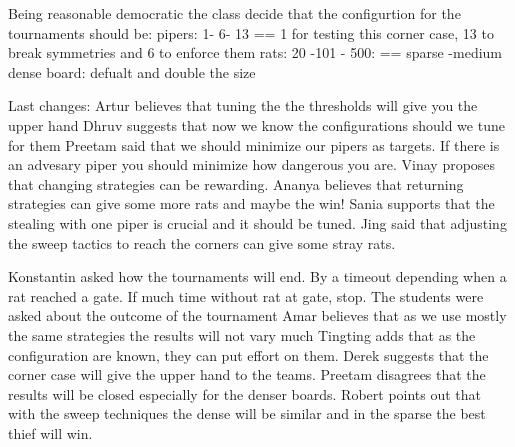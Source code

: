 Being reasonable democratic the class decide that the configurtion for the tournaments should be:
pipers: 1- 6- 13 == 1 for testing this corner case, 13 to break symmetries and 6 to enforce them
rats: 20 -101 - 500: == sparse -medium dense
board: defualt and double the size

Last changes:
Artur believes that tuning the the thresholds will give you the upper hand
Dhruv suggests that now we know the configurations should we tune for them
Preetam said that we should minimize our pipers as targets. If there is an advesary piper
you should minimize how dangerous you are.
Vinay proposes that changing strategies can be rewarding.
Ananya believes that returning strategies can give some more rats and maybe the win!
Sania supports that the stealing with one piper is crucial and it should be tuned.
Jing said that adjusting the sweep tactics to reach the corners can give some stray rats.

Konstantin asked how the tournaments will end. By a timeout depending when a rat reached a gate. If much time without rat at gate, stop.
The students were asked about the outcome of the tournament
Amar believes that as we use mostly the same strategies the results will not vary much
Tingting adds that as the configuration are known, they can put effort on them.
Derek suggests that the corner case will give the upper hand to the teams.
Preetam disagrees that the results will be closed especially for the denser boards.
Robert points out that with the sweep techniques the dense will be similar and in the sparse the best thief will win.
